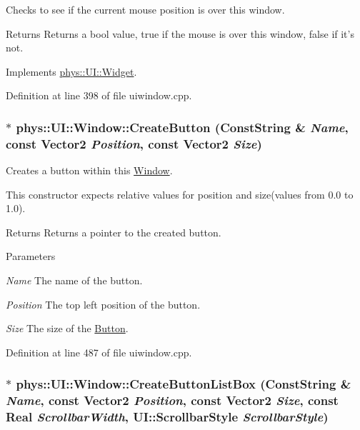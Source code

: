 Checks to see if the current mouse position is over this window. 

\begin{DoxyReturn}{Returns}
Returns a bool value, true if the mouse is over this window, false if it's not. 
\end{DoxyReturn}


Implements \hyperlink{classphys_1_1UI_1_1Widget_a613df6dbb42efe139d185043a00259dc}{phys::UI::Widget}.



Definition at line 398 of file uiwindow.cpp.

\hypertarget{classphys_1_1UI_1_1Window_a5414660c47246997cd1ed9654847055b}{
\subsubsection[{CreateButton}]{ $\ast$ phys::UI::Window::CreateButton ({\bf ConstString} \& {\em Name}, \/  const {\bf Vector2} {\em Position}, \/  const {\bf Vector2} {\em Size})}}
\label{d4/d86/classphys_1_1UI_1_1Window_a5414660c47246997cd1ed9654847055b}


Creates a button within this \hyperlink{classphys_1_1UI_1_1Window}{Window}. 

This constructor expects relative values for position and size(values from 0.0 to 1.0). \begin{DoxyReturn}{Returns}
Returns a pointer to the created button. 
\end{DoxyReturn}

\begin{DoxyParams}{Parameters}
\item[{\em Name}]The name of the button. \item[{\em Position}]The top left position of the button. \item[{\em Size}]The size of the \hyperlink{classphys_1_1UI_1_1Button}{Button}. \end{DoxyParams}


Definition at line 487 of file uiwindow.cpp.

\hypertarget{classphys_1_1UI_1_1Window_a236c65069633c605a71623993e8ad68e}{
\subsubsection[{CreateButtonListBox}]{ $\ast$ phys::UI::Window::CreateButtonListBox ({\bf ConstString} \& {\em Name}, \/  const {\bf Vector2} {\em Position}, \/  const {\bf Vector2} {\em Size}, \/  const {\bf Real} {\em ScrollbarWidth}, \/  UI::ScrollbarStyle {\em ScrollbarStyle})}}
\label{d4/d86/classphys_1_1UI_1_1Window_a236c65069633c605a71623993e8ad68e}


